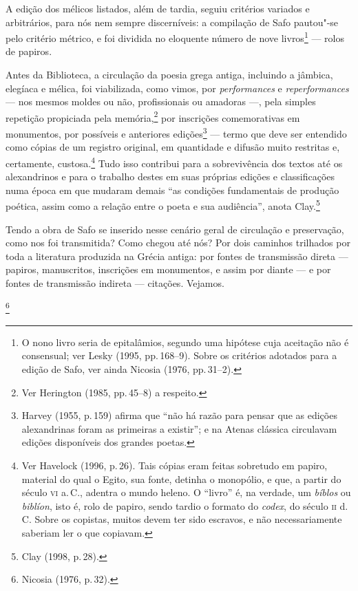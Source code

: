 A edição dos mélicos listados, além de tardia, seguiu critérios variados e
arbitrários, para nós nem sempre discerníveis: a compilação de Safo pautou"-se
pelo critério métrico, e foi dividida no eloquente número de nove
livros\footnote{ O nono livro seria de epitalâmios, segundo uma hipótese cuja
aceitação não é consensual; ver Lesky (1995, pp.\,168--9). Sobre os critérios
adotados para a edição de Safo, ver ainda Nicosia (1976, pp.\,31--2).}  --- rolos de papiros.

Antes da Biblioteca, a circulação da poesia grega antiga, incluindo a jâmbica,
elegíaca e mélica, foi viabilizada, como vimos, por \emph{performances} e
\emph{reperformances} --- nos mesmos moldes ou não, profissionais ou amadoras ---, pela
simples repetição propiciada pela memória,\footnote{ Ver Herington (1985, pp.\,45--8) a respeito.} por inscrições comemorativas em monumentos, por possíveis
e anteriores edições\footnote{ Harvey (1955, p.\,159) afirma que “não há razão para pensar
que as edições alexandrinas foram as primeiras a existir”; e na Atenas clássica
circulavam edições disponíveis dos grandes poetas.} --- termo que deve ser
entendido como cópias de um registro original, em quantidade e difusão muito
restritas e, certamente, custosa.\footnote{ Ver Havelock (1996, p.\,26). Tais
cópias eram feitas sobretudo em papiro, material do qual o Egito, sua fonte,
detinha o monopólio, e que, a partir do século \textsc{vi} a.\,C., adentra o mundo heleno.
O “livro” é, na verdade, um \emph{bíblos} ou \emph{biblíon}, isto é, rolo
de papiro, sendo tardio o formato do \emph{codex}, do século \textsc{ii} d.\,C. Sobre
os copistas, muitos devem ter sido escravos, e não necessariamente saberiam ler
o que copiavam.} Tudo isso contribui para a sobrevivência dos textos até os
alexandrinos e para o trabalho destes em suas próprias edições e classificações
numa época em que mudaram demais “as condições fundamentais de produção
poética, assim como a relação entre o poeta e sua audiência”, anota Clay.\footnote{ Clay (1998, p.\,28).} 

Tendo a obra de Safo se inserido nesse cenário geral de circulação e
preservação, como nos foi transmitida? Como chegou até nós? Por dois caminhos
trilhados por toda a literatura produzida na Grécia antiga: por fontes de
transmissão direta --- papiros, manuscritos, inscrições em monumentos, e assim
por diante --- e por fontes de transmissão indireta --- citações. Vejamos. 

\footnote{ Nicosia (1976, p.\,32).}


